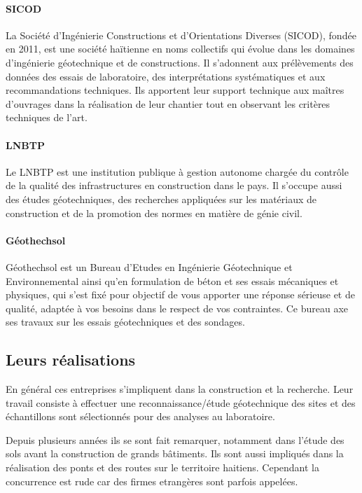        \paragraph{SICOD}
        La  Société d’Ingénierie Constructions et d’Orientations Diverses (SICOD),
         fondée en 2011, est une société haïtienne en noms collectifs qui évolue dans les domaines d’ingénierie géotechnique et de constructions.
         Il s'adonnent aux prélèvements des données des essais de laboratoire, des interprétations systématiques et aux recommandations techniques. 
         Ils apportent leur support technique aux maîtres d'ouvrages dans la réalisation de leur chantier tout en observant les critères techniques de l'art.
        \paragraph{LNBTP}
        Le LNBTP est une institution publique à gestion autonome chargée du contrôle de la qualité des infrastructures en construction dans le pays. Il s'occupe 
        aussi des études géotechniques, des recherches appliquées sur les matériaux de construction et de la promotion des normes en matière de génie civil.
        \paragraph{Géothechsol}
        Géothechsol est un Bureau d’Etudes en Ingénierie Géotechnique et Environnemental ainsi qu’en formulation de béton et ses essais mécaniques et physiques,
         qui s’est fixé pour objectif de vous apporter une réponse sérieuse et de qualité, adaptée à vos besoins dans le respect de vos contraintes.
         Ce bureau axe ses travaux sur les essais géotechniques et des sondages.

        \subsection{Leurs réalisations}
        En général ces entreprises s'impliquent dans la construction et la recherche. 
        Leur travail consiste à effectuer une reconnaissance/étude géotechnique des sites et des échantillons  sont sélectionnés pour des analyses au
        laboratoire.
        \par
        Depuis plusieurs années ils se sont fait remarquer, notamment dans
         l'étude des sols avant la construction de grands bâtiments. Ils sont aussi impliqués dans la réalisation des ponts et des routes sur le territoire
          haitiens. Cependant la concurrence est rude car des firmes etrangères sont parfois appelées. 
